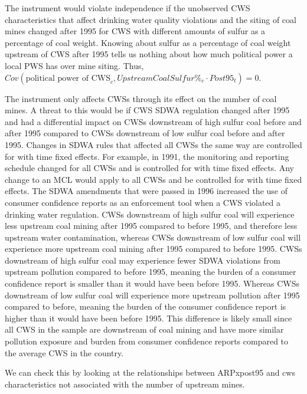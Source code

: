 \documentclass{article}
\begin{document}
The instrument would violate independence if the unobserved CWS characteristics that affect drinking water quality violations and the siting of coal mines changed after 1995 for CWS with different amounts of sulfur as a percentage of coal weight. Knowing about sulfur as a percentage of coal weight upstream of CWS after 1995 tells us nothing about how much political power a local PWS has over mine siting. Thus, $Cov(\text{political power of CWS}_c, UpstreamCoalSulfur\%_c \cdot Post95_t)=0$. 

The instrument only affects CWSs through its effect on the number of coal mines. A threat to this would be if CWS SDWA regulation changed after 1995 and had a differential impact on CWSs downstream of high sulfur coal before and after 1995 compared to CWSs downstream of low sulfur coal before and after 1995. Changes in SDWA rules that affected all CWSs the same way are controlled for with time fixed effects. For example, in 1991, the monitoring and reporting schedule changed for all CWSs and is controlled for with time fixed effects. Any change to an MCL would apply to all CWSs and be controlled for with time fixed effects. The SDWA amendments that were passed in 1996 increased the use of consumer confidence reports as an enforcement tool when a CWS violated a drinking water regulation. CWSs downstream of high sulfur coal will experience less upstream coal mining after 1995 compared to before 1995, and therefore less upstream water contamination, whereas CWSs downstream of low sulfur coal will experience more upstream coal mining after 1995 compared to before 1995. CWSs downstream of high sulfur coal may experience fewer SDWA violations from upstream pollution compared to before 1995, meaning the burden of a consumer confidence report is smaller than it would have been before 1995. Whereas CWSs downstream of low sulfur coal will experience more upstream pollution after 1995 compared to before, meaning the burden of the consumer confidence report is higher than it would have been before 1995. This difference is likely small since all CWS in the sample are downstream of coal mining and have more similar pollution exposure and burden from consumer confidence reports compared to the average CWS in the country.

We can check this by looking at the relationships between ARPxpost95 and cws characteristics not associated with the number of upstream mines.
\end{document}
